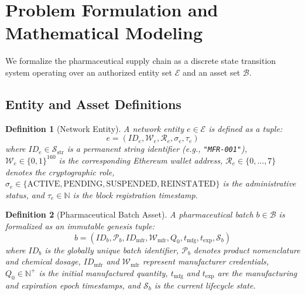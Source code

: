\documentclass[pdflatex,sn-mathphys-num]{sn-jnl}
\theoremstyle{thmstyleone}
\theoremstyle{thmstyletwo}
\theoremstyle{thmstylethree}
\newtheorem{definition}{Definition}
\begin{document}

\section{Problem Formulation and Mathematical Modeling}\label{sec:problem-formulation}

We formalize the pharmaceutical supply chain as a discrete state transition system operating over an authorized entity set $\mathcal{E}$ and an asset set $\mathcal{B}$.

\subsection{Entity and Asset Definitions}

\begin{definition}[Network Entity]
A network entity $e \in \mathcal{E}$ is defined as a tuple:
\begin{equation}
e = (ID_e, \mathcal{W}_e, \mathcal{R}_e, \sigma_e, \tau_e)
\end{equation}
where $ID_e \in \mathcal{S}_{\text{str}}$ is a permanent string identifier (e.g., \texttt{"MFR-001"}), $\mathcal{W}_e \in \{0,1\}^{160}$ is the corresponding Ethereum wallet address, $\mathcal{R}_e \in \{0, \dots, 7\}$ denotes the cryptographic role, $\sigma_e \in \{\text{ACTIVE}, \text{PENDING}, \text{SUSPENDED}, \text{REINSTATED}\}$ is the administrative status, and $\tau_e \in \mathbb{N}$ is the block registration timestamp.
\end{definition}

\begin{definition}[Pharmaceutical Batch Asset]
A pharmaceutical batch $b \in \mathcal{B}$ is formalized as an immutable genesis tuple:
\begin{equation}
b = (ID_b, \mathcal{P}_b, ID_{\text{mfr}}, \mathcal{W}_{\text{mfr}}, Q_0, t_{\text{mfg}}, t_{\text{exp}}, \mathcal{S}_b)
\end{equation}
where $ID_b$ is the globally unique batch identifier, $\mathcal{P}_b$ denotes product nomenclature and chemical dosage, $ID_{\text{mfr}}$ and $\mathcal{W}_{\text{mfr}}$ represent manufacturer credentials, $Q_0 \in \mathbb{N}^+$ is the initial manufactured quantity, $t_{\text{mfg}}$ and $t_{\text{exp}}$ are the manufacturing and expiration epoch timestamps, and $\mathcal{S}_b$ is the current lifecycle state.
\end{definition}
\end{document}
